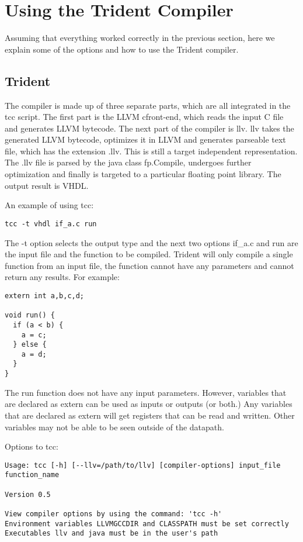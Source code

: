 \section{Using the Trident Compiler}
Assuming that everything worked correctly in the previous section, here we explain some
of the options and how to use the Trident compiler.

\subsection{Trident}

The compiler is made up of three separate parts, which are all
integrated in the tcc script.  The first part is the LLVM cfront-end,
which reads the input C file and generates LLVM bytecode.  The next
part of the compiler is llv.  llv takes the generated LLVM bytecode,
optimizes it in LLVM and generates parseable text file, which has the
extension .llv.  This is still a target independent representation.
The .llv file is parsed by the java class fp.Compile, undergoes
further optimization and finally is targeted to a particular floating
point library.  The output result is VHDL.


An example of using tcc:

\begin{verbatim}
tcc -t vhdl if_a.c run
\end{verbatim}

The -t option selects the output type and the next two options if\_a.c
and run are the input file and the function to be compiled.  Trident
will only compile a single function from an input file, the function
cannot have any parameters and cannot return any results.  For
example:

\begin{verbatim}
extern int a,b,c,d;

void run() { 
  if (a < b) {
    a = c;
  } else {
    a = d;
  }
}
\end{verbatim}

The run function does not have any input parameters.  However,
variables that are declared as extern can be used as inputs or outputs
(or both.)  Any variables that are declared as extern will get
registers that can be read and written.  Other variables may not be
able to be seen outside of the datapath.


Options to tcc:

\begin{verbatim}
Usage: tcc [-h] [--llv=/path/to/llv] [compiler-options] input_file function_name

Version 0.5

View compiler options by using the command: 'tcc -h' 
Environment variables LLVMGCCDIR and CLASSPATH must be set correctly
Executables llv and java must be in the user's path
\end{verbatim}


